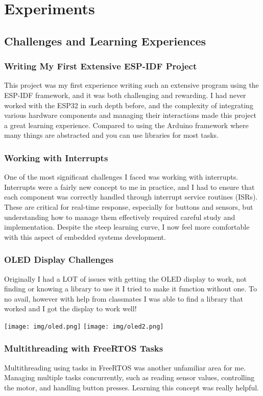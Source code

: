 \section{Experiments}
\label{sec:experiments}

\subsection{Challenges and Learning Experiences}

\subsubsection{Writing My First Extensive ESP-IDF Project}
This project was my first experience writing such an extensive program using the ESP-IDF framework, and it was both challenging and rewarding. I had never worked with the ESP32 in such depth before, and the complexity of integrating various hardware components and managing their interactions made this project a great learning experience. Compared to using the Arduino framework where many things are abstracted and you can use libraries for most tasks.

\subsubsection{Working with Interrupts}
One of the most significant challenges I faced was working with interrupts. Interrupts were a fairly new concept to me in practice, and I had to ensure that each component was correctly handled through interrupt service routines (ISRs). These are critical for real-time response, especially for buttons and sensors, but understanding how to manage them effectively required careful study and implementation. Despite the steep learning curve, I now feel more comfortable with this aspect of embedded systems development.

\subsubsection{OLED Display Challenges}
Originally I had a LOT of issues with getting the OLED display to work, not finding or knowing a library to use it I tried to make it function without one. To no avail, however with help from classmates I was able to find a library that worked and I got the display to work well!

\texttt{[image: img/oled.png]}
\texttt{[image: img/oled2.png]}

\subsubsection{Multithreading with FreeRTOS Tasks}
Multithreading using tasks in FreeRTOS was another unfamiliar area for me. Managing multiple tasks concurrently, such as reading sensor values, controlling the motor, and handling button presses. Learning this concept was really helpful.

